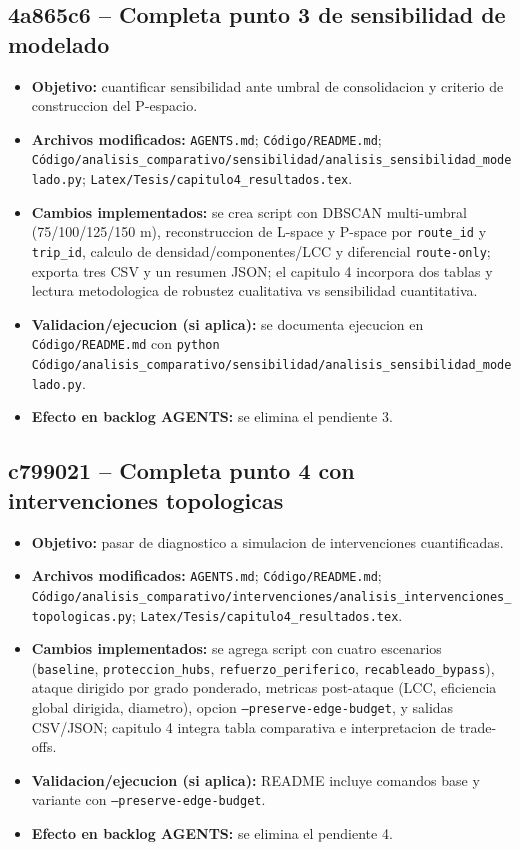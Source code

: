 \documentclass[11pt]{article}
\begin{document}
\subsection{4a865c6 -- Completa punto 3 de sensibilidad de modelado}
\begin{itemize}
  \item \textbf{Objetivo:} cuantificar sensibilidad ante umbral de consolidacion y criterio de construccion del P-espacio.
  \item \textbf{Archivos modificados:} \texttt{AGENTS.md}; \texttt{C\'odigo/README.md}; \texttt{C\'odigo/analisis\_comparativo/sensibilidad/analisis\_sensibilidad\_modelado.py}; \texttt{Latex/Tesis/capitulo4\_resultados.tex}.
  \item \textbf{Cambios implementados:} se crea script con DBSCAN multi-umbral (75/100/125/150 m), reconstruccion de L-space y P-space por \texttt{route\_id} y \texttt{trip\_id}, calculo de densidad/componentes/LCC y diferencial \texttt{route-only}; exporta tres CSV y un resumen JSON; el capitulo 4 incorpora dos tablas y lectura metodologica de robustez cualitativa vs sensibilidad cuantitativa.
  \item \textbf{Validacion/ejecucion (si aplica):} se documenta ejecucion en \texttt{C\'odigo/README.md} con \texttt{python C\'odigo/analisis\_comparativo/sensibilidad/analisis\_sensibilidad\_modelado.py}.
  \item \textbf{Efecto en backlog AGENTS:} se elimina el pendiente 3.
\end{itemize}

\subsection{c799021 -- Completa punto 4 con intervenciones topologicas}
\begin{itemize}
  \item \textbf{Objetivo:} pasar de diagnostico a simulacion de intervenciones cuantificadas.
  \item \textbf{Archivos modificados:} \texttt{AGENTS.md}; \texttt{C\'odigo/README.md}; \texttt{C\'odigo/analisis\_comparativo/intervenciones/analisis\_intervenciones\_topologicas.py}; \texttt{Latex/Tesis/capitulo4\_resultados.tex}.
  \item \textbf{Cambios implementados:} se agrega script con cuatro escenarios (\texttt{baseline}, \texttt{proteccion\_hubs}, \texttt{refuerzo\_periferico}, \texttt{recableado\_bypass}), ataque dirigido por grado ponderado, metricas post-ataque (LCC, eficiencia global dirigida, diametro), opcion \texttt{--preserve-edge-budget}, y salidas CSV/JSON; capitulo 4 integra tabla comparativa e interpretacion de trade-offs.
  \item \textbf{Validacion/ejecucion (si aplica):} README incluye comandos base y variante con \texttt{--preserve-edge-budget}.
  \item \textbf{Efecto en backlog AGENTS:} se elimina el pendiente 4.
\end{itemize}
\end{document}
